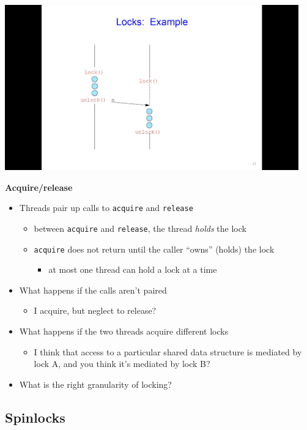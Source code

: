 \documentclass[11pt,a4paper]{article}
\begin{document}
\includegraphics[height=270]{locks.jpg}

\textbf{Acquire/release}
\begin{itemize}
    \item Threads pair up calls to \texttt{acquire} and \texttt{release}
        \begin{itemize}
            \item between \texttt{acquire} and \texttt{release}, the thread \emph{holds}
                the lock
            \item \texttt{acquire} does not return until the caller ``owns'' (holds) the lock
                \begin{itemize}
                    \item at most one thread can hold a lock at a time
                \end{itemize}
        \end{itemize}
    \item What happens if the calls aren't paired
        \begin{itemize}
            \item I acquire, but neglect to release?
        \end{itemize}
    \item What happens if the two threads acquire different locks
        \begin{itemize}
            \item I think that access to a particular shared data structure is
                mediated by lock A, and you think it's mediated by lock B?\
        \end{itemize}
    \item What is the right granularity of locking?
\end{itemize}

\subsection{Spinlocks}
\end{document}
